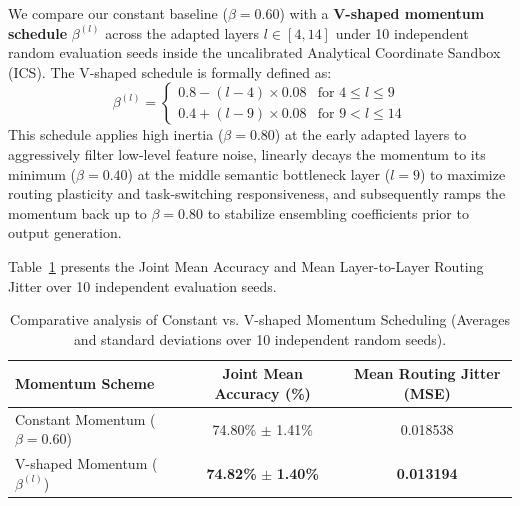 \documentclass{article}
\theoremstyle{plain}
\theoremstyle{definition}
\theoremstyle{remark}
\begin{document}
    We compare our constant baseline ($\beta = 0.60$) with a \textbf{V-shaped momentum schedule} $\beta^{(l)}$ across the adapted layers $l \in [4, 14]$ under 10 independent random evaluation seeds inside the uncalibrated Analytical Coordinate Sandbox (ICS). The V-shaped schedule is formally defined as:
    \begin{equation}
    \beta^{(l)} = 
    \begin{cases} 
      0.8 - (l - 4) \times 0.08 & \text{for } 4 \le l \le 9 \\
      0.4 + (l - 9) \times 0.08 & \text{for } 9 < l \le 14 
    \end{cases}
    \end{equation}
    This schedule applies high inertia ($\beta = 0.80$) at the early adapted layers to aggressively filter low-level feature noise, linearly decays the momentum to its minimum ($\beta = 0.40$) at the middle semantic bottleneck layer ($l = 9$) to maximize routing plasticity and task-switching responsiveness, and subsequently ramps the momentum back up to $\beta = 0.80$ to stabilize ensembling coefficients prior to output generation.

    Table~\ref{tab:v_beta_results} presents the Joint Mean Accuracy and Mean Layer-to-Layer Routing Jitter over 10 independent evaluation seeds.

    \begin{table}[h]
    \centering
    \caption{Comparative analysis of Constant vs. V-shaped Momentum Scheduling (Averages and standard deviations over 10 independent random seeds).}
    \label{tab:v_beta_results}
    \vskip 0.15in
    \begin{tabular}{lcc}
    \toprule
    \textbf{Momentum Scheme} & \textbf{Joint Mean Accuracy (\%)} & \textbf{Mean Routing Jitter (MSE)} \\
    \midrule
    Constant Momentum ($\beta = 0.60$) & 74.80\% $\pm$ 1.41\% & 0.018538 \\
    V-shaped Momentum ($\beta^{(l)}$) & \textbf{74.82\%} $\pm$ \textbf{1.40\%} & \textbf{0.013194} \\
    \bottomrule
    \end{tabular}
    \end{table}
\end{document}
